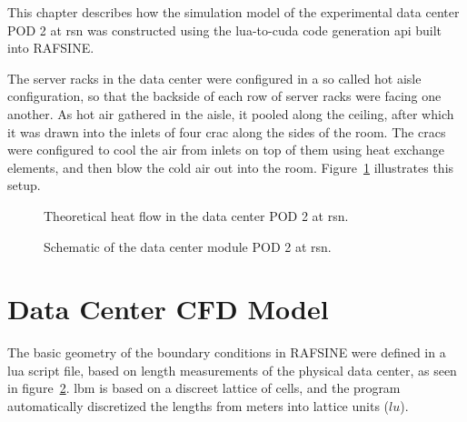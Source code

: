 This chapter describes how the simulation model of the experimental data center POD 2 at \gls{rsn} was constructed using the \gls{lua}-to-\gls{cuda} code generation \gls{api} built into RAFSINE.

The server racks in the data center were configured in a so called hot aisle configuration, so that the backside of each row of server racks were facing one another. As hot air gathered in the aisle, it pooled along the ceiling, after which it was drawn into the inlets of four \gls{crac} along the sides of the room. The \gls{crac}s were configured to cool the air from inlets on top of them using heat exchange elements, and then blow the cold air out into the room. Figure~\ref{fig:flow} illustrates this setup.


\begin{figure}[!htb]
\centering
\begin{small} %
\def\svgwidth{0.65\linewidth}

\end{small}
\caption{Theoretical heat flow in the data center POD 2 at \gls{rsn}.}
\label{fig:flow}
\end{figure}

\begin{figure}[!htb]
\centering
\begin{scriptsize} %
\def\svgwidth{\linewidth}

\end{scriptsize}
\caption{Schematic of the data center module POD 2 at \gls{rsn}.}
\label{fig:floor_plan}
\end{figure}

\clearpage

\section{Data Center CFD Model} \label{sec:modeling}
The basic geometry of the boundary conditions in RAFSINE were defined in a \gls{lua} script file, based on length measurements of the physical data center, as seen in figure~\ref{fig:floor_plan}. \gls{lbm} is based on a discreet lattice of cells, and the program automatically discretized the lengths from meters into lattice units ($lu$).

